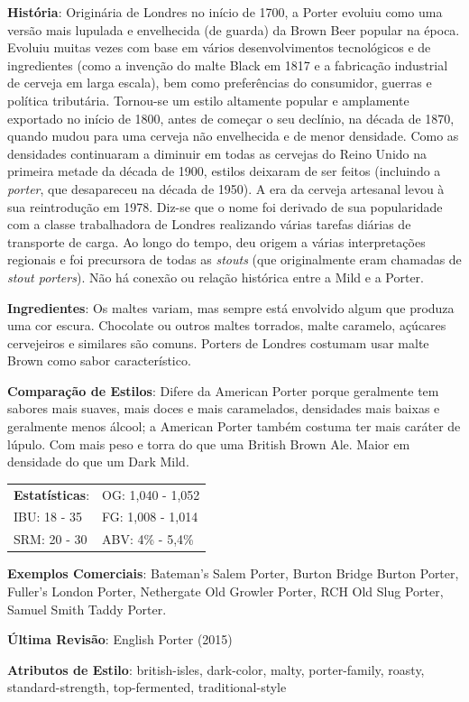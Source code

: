 \textbf{História}: Originária de Londres no início de 1700, a Porter evoluiu como uma versão mais lupulada e envelhecida (de guarda) da Brown Beer popular na época. Evoluiu muitas vezes com base em vários desenvolvimentos tecnológicos e de ingredientes (como a invenção do malte Black em 1817 e a fabricação industrial de cerveja em larga escala), bem como preferências do consumidor, guerras e política tributária. Tornou-se um estilo altamente popular e amplamente exportado no início de 1800, antes de começar o seu declínio, na década de 1870, quando mudou para uma cerveja não envelhecida e de menor densidade. Como as densidades continuaram a diminuir em todas as cervejas do Reino Unido na primeira metade da década de 1900, estilos deixaram de ser feitos (incluindo a \textit{porter}, que desapareceu na década de 1950). A era da cerveja artesanal levou à sua reintrodução em 1978. Diz-se que o nome foi derivado de sua popularidade com a classe trabalhadora de Londres realizando várias tarefas diárias de transporte de carga. Ao longo do tempo, deu origem a várias interpretações regionais e foi precursora de todas as \textit{stouts} (que originalmente eram chamadas de \textit{stout porters}). Não há conexão ou relação histórica entre a Mild e a Porter.

\textbf{Ingredientes}: Os maltes variam, mas sempre está envolvido algum que produza uma cor escura. Chocolate ou outros maltes torrados, malte caramelo, açúcares cervejeiros e similares são comuns. Porters de Londres costumam usar malte Brown como sabor característico.

\textbf{Comparação de Estilos}: Difere da American Porter porque geralmente tem sabores mais suaves, mais doces e mais caramelados, densidades mais baixas e geralmente menos álcool; a American Porter também costuma ter mais caráter de lúpulo. Com mais peso e torra do que uma British Brown Ale. Maior em densidade do que um Dark Mild.

\begin{tabular}{@{}p{35mm}p{35mm}@{}}
  \textbf{Estatísticas}: & OG: 1,040 - 1,052 \\
  IBU: 18 - 35  & FG: 1,008 - 1,014  \\
  SRM: 20 - 30  & ABV: 4\% - 5,4\%
\end{tabular}

\textbf{Exemplos Comerciais}: Bateman’s Salem Porter, Burton Bridge Burton Porter, Fuller's London Porter, Nethergate Old Growler Porter, RCH Old Slug Porter, Samuel Smith Taddy Porter.

\textbf{Última Revisão}: English Porter (2015)

\textbf{Atributos de Estilo}: british-isles, dark-color, malty, porter-family, roasty, standard-strength, top-fermented, traditional-style
